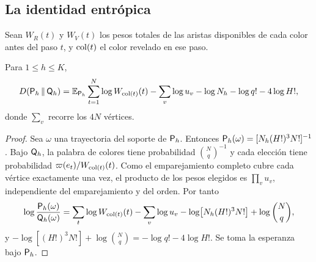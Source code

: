 \subsection{La identidad entrópica}

Sean $W_R(t)$ y $W_V(t)$ los pesos totales de las aristas disponibles de cada color antes del
paso $t$, y $\mathrm{col}(t)$ el color revelado en ese paso.

\begin{lema}\label{lem:identidad}
Para $1\le h\le K$,
\[
 D(\mathsf{P}_h\,\Vert\,\mathsf{Q}_h)=\mathbb{E}_{\mathsf{P}_h}\sum_{t=1}^N\log W_{\mathrm{col}(t)}(t)-\sum_v\log u_v-\log N_h-\log q!
 -4\log H!,
\]
donde $\sum_v$ recorre los $4N$ vértices.
\end{lema}

\begin{proof}
Sea $\omega$ una trayectoria del soporte de $\mathsf{P}_h$. Entonces $\mathsf{P}_h(\omega)=[N_h(H!)^3N!]^{-1}$.
Bajo $\mathsf{Q}_h$, la palabra de colores tiene probabilidad $\binom Nq^{-1}$ y cada elección tiene
probabilidad $\varpi(e_t)/W_{\mathrm{col}(t)}(t)$. Como el emparejamiento completo cubre cada vértice
exactamente una vez, el producto de los pesos elegidos es $\prod_vu_v$, independiente del
emparejamiento y del orden. Por tanto
\[
 \log\frac{\mathsf{P}_h(\omega)}{\mathsf{Q}_h(\omega)}=\sum_t\log W_{\mathrm{col}(t)}(t)-\sum_v\log u_v
 -\log\bigl[N_h(H!)^3N!\bigr]+\log\binom Nq ,
\]
y $-\log[(H!)^3N!]+\log\binom Nq=-\log q!-4\log H!$. Se toma la esperanza bajo $\mathsf{P}_h$.
\end{proof}
